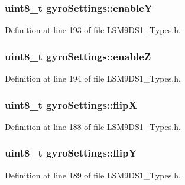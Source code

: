 \subsubsection[{\texorpdfstring{enableY}{enableY}}]{\setlength{\rightskip}{0pt plus 5cm}uint8\+\_\+t gyro\+Settings\+::enableY}\hypertarget{structgyro_settings_a4d6ea95b7a52daab6d48dc128c83f3d8}{}\label{structgyro_settings_a4d6ea95b7a52daab6d48dc128c83f3d8}


Definition at line 193 of file L\+S\+M9\+D\+S1\+\_\+\+Types.\+h.

\subsubsection[{\texorpdfstring{enableZ}{enableZ}}]{\setlength{\rightskip}{0pt plus 5cm}uint8\+\_\+t gyro\+Settings\+::enableZ}\hypertarget{structgyro_settings_a86a86182fd841bd651672d43803b5c63}{}\label{structgyro_settings_a86a86182fd841bd651672d43803b5c63}


Definition at line 194 of file L\+S\+M9\+D\+S1\+\_\+\+Types.\+h.

\subsubsection[{\texorpdfstring{flipX}{flipX}}]{\setlength{\rightskip}{0pt plus 5cm}uint8\+\_\+t gyro\+Settings\+::flipX}\hypertarget{structgyro_settings_a877b529e39287bed155acbca97a75540}{}\label{structgyro_settings_a877b529e39287bed155acbca97a75540}


Definition at line 188 of file L\+S\+M9\+D\+S1\+\_\+\+Types.\+h.

\subsubsection[{\texorpdfstring{flipY}{flipY}}]{\setlength{\rightskip}{0pt plus 5cm}uint8\+\_\+t gyro\+Settings\+::flipY}\hypertarget{structgyro_settings_a2137659e07899a0efccc941e003c07e0}{}\label{structgyro_settings_a2137659e07899a0efccc941e003c07e0}


Definition at line 189 of file L\+S\+M9\+D\+S1\+\_\+\+Types.\+h.

